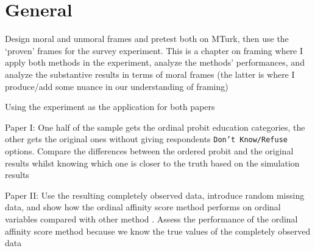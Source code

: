 \documentclass[12pt]{article}
\begin{document}

\section*{General}
	\begin{coi}
		\item Design moral and unmoral frames and pretest both on MTurk, then use the `proven' frames for the survey experiment. This is a chapter on framing where I apply both methods in the experiment, analyze the methods' performances, and analyze the substantive results in terms of moral frames (the latter is where I produce/add some nuance in our understanding of framing)
		\item Using the experiment as the application for both papers
			\begin{coi}
				\item Paper I: One half of the sample gets the ordinal probit education categories, the other gets the original ones without giving respondents \texttt{Don't Know/Refuse} options. Compare the differences between the ordered probit and the original results whilst knowing which one is closer to the truth based on the simulation results
				\item Paper II: Use the resulting completely observed data, introduce random missing data, and show how the ordinal affinity score method performs on ordinal variables compared with other method	. Assess the performance of the ordinal affinity score method because we know the true values of the completely observed data
			\end{coi}
	\end{coi}	
		
\end{document}
